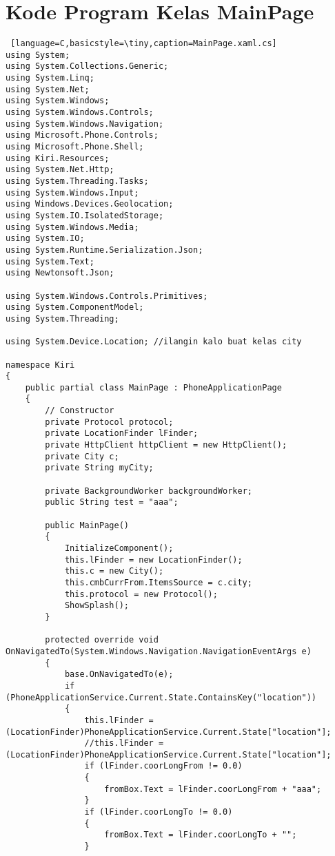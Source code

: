 \chapter{Kode Program Kelas MainPage}
\label{app:A}

\singlespacing 

\begin{lstlisting} [language=C,basicstyle=\tiny,caption=MainPage.xaml.cs]
using System;
using System.Collections.Generic;
using System.Linq;
using System.Net;
using System.Windows;
using System.Windows.Controls;
using System.Windows.Navigation;
using Microsoft.Phone.Controls;
using Microsoft.Phone.Shell;
using Kiri.Resources;
using System.Net.Http;
using System.Threading.Tasks;
using System.Windows.Input;
using Windows.Devices.Geolocation;
using System.IO.IsolatedStorage;
using System.Windows.Media;
using System.IO;
using System.Runtime.Serialization.Json;
using System.Text;
using Newtonsoft.Json;

using System.Windows.Controls.Primitives;
using System.ComponentModel;
using System.Threading;

using System.Device.Location; //ilangin kalo buat kelas city

namespace Kiri
{
    public partial class MainPage : PhoneApplicationPage
    {
        // Constructor
        private Protocol protocol;
        private LocationFinder lFinder;
        private HttpClient httpClient = new HttpClient();
        private City c;
        private String myCity;

        private BackgroundWorker backgroundWorker;
        public String test = "aaa";
        
        public MainPage()
        {
            InitializeComponent();
            this.lFinder = new LocationFinder();
            this.c = new City();
            this.cmbCurrFrom.ItemsSource = c.city;
            this.protocol = new Protocol();
            ShowSplash();
        }

        protected override void OnNavigatedTo(System.Windows.Navigation.NavigationEventArgs e)
        {
            base.OnNavigatedTo(e);
            if (PhoneApplicationService.Current.State.ContainsKey("location"))
            {
                this.lFinder = (LocationFinder)PhoneApplicationService.Current.State["location"];
                //this.lFinder = (LocationFinder)PhoneApplicationService.Current.State["location"];
                if (lFinder.coorLongFrom != 0.0)
                {
                    fromBox.Text = lFinder.coorLongFrom + "aaa";
                }
                if (lFinder.coorLongTo != 0.0)
                {
                    fromBox.Text = lFinder.coorLongTo + "";
                }
                

\end{lstlisting}
